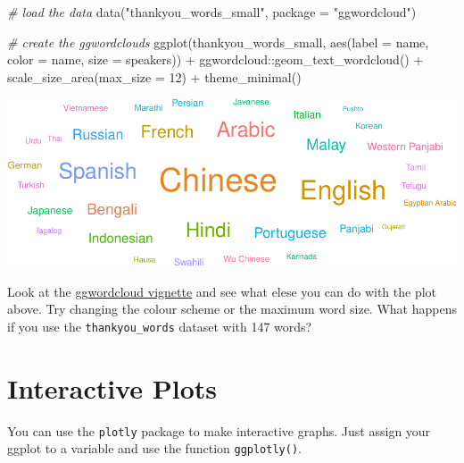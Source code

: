 \documentclass[
  oneside]{book}
\newenvironment{Shaded}{\begin{snugshade}}{\end{snugshade}}
\newcommand{\AttributeTok}[1]{\textcolor[rgb]{0.77,0.63,0.00}{#1}}
\newcommand{\CommentTok}[1]{\textcolor[rgb]{0.56,0.35,0.01}{\textit{#1}}}
\newcommand{\DecValTok}[1]{\textcolor[rgb]{0.00,0.00,0.81}{#1}}
\newcommand{\FunctionTok}[1]{\textcolor[rgb]{0.00,0.00,0.00}{#1}}
\newcommand{\NormalTok}[1]{#1}
\newcommand{\SpecialCharTok}[1]{\textcolor[rgb]{0.00,0.00,0.00}{#1}}
\newcommand{\StringTok}[1]{\textcolor[rgb]{0.31,0.60,0.02}{#1}}
\begin{document}
\begin{Shaded}
\begin{Highlighting}[]
\CommentTok{\# load the data}
\FunctionTok{data}\NormalTok{(}\StringTok{"thankyou\_words\_small"}\NormalTok{, }\AttributeTok{package =} \StringTok{"ggwordcloud"}\NormalTok{)}

\CommentTok{\# create the ggwordclouds}
\FunctionTok{ggplot}\NormalTok{(thankyou\_words\_small, }
                   \FunctionTok{aes}\NormalTok{(}\AttributeTok{label =}\NormalTok{ name, }
                       \AttributeTok{color =}\NormalTok{ name, }
                       \AttributeTok{size =}\NormalTok{ speakers)) }\SpecialCharTok{+}
\NormalTok{  ggwordcloud}\SpecialCharTok{::}\FunctionTok{geom\_text\_wordcloud}\NormalTok{() }\SpecialCharTok{+}
  \FunctionTok{scale\_size\_area}\NormalTok{(}\AttributeTok{max\_size =} \DecValTok{12}\NormalTok{) }\SpecialCharTok{+}
  \FunctionTok{theme\_minimal}\NormalTok{()}
\end{Highlighting}
\end{Shaded}

\begin{center}\includegraphics[width=0.9\linewidth]{images/unnamed-chunk-6-1} \end{center}

\begin{try}
Look at the \href{https://cran.r-project.org/web/packages/ggwordcloud/vignettes/ggwordcloud.html}{ggwordcloud vignette} and see what elese you can do with the plot above. Try changing the colour scheme or the maximum word size. What happens if you use the \texttt{thankyou\_words} dataset with 147 words?

\end{try}

\hypertarget{plotly}{%
\section{Interactive Plots}\label{plotly}}

You can use the \texttt{plotly} package to make interactive graphs. Just assign your ggplot to a variable and use the function \texttt{ggplotly()}.
\end{document}
